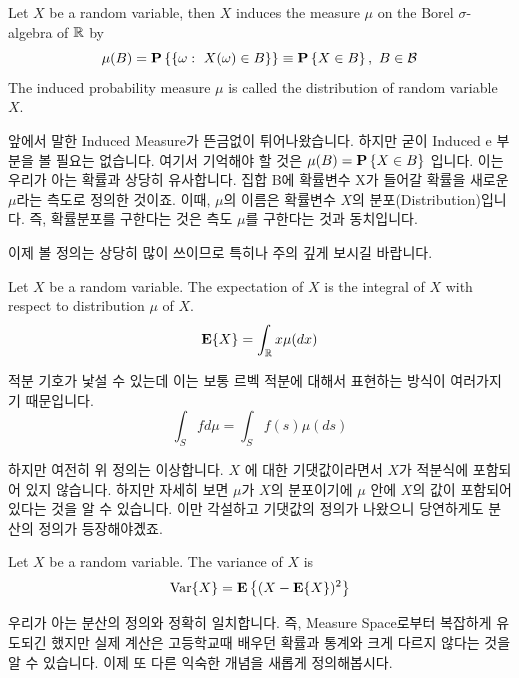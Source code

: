 \documentclass[final]{IEEEphot}
\begin{document}
\begin{definition}
	Let $X$ be a random variable, then $X$ induces the measure $\mu$ on the Borel $\sigma$-algebra of $\mathbb{R}$ by
	$$\mu(B) = \mathbf{P} \left\{ \{\omega:~ X(\omega)\in B\} \right\} \equiv \mathbf{P} \left\{ X\in B \right\}, ~ B \in \mathcal{B}$$
	The induced probability measure $\mu$ is called the distribution of random variable $X$.
	
	\HL
\end{definition}

앞에서 말한 Induced Measure가 뜬금없이 튀어나왔습니다. 하지만 굳이 Induced e 부분을 볼 필요는 없습니다. 여기서 기억해야 할 것은 $\mu(B) = \mathbf{P} \left\{ X \in B \right\}$ 입니다. 이는 우리가 아는 확률과 상당히 유사합니다. 집합 B에 확률변수 X가 들어갈 확률을 새로운 $\mu$라는 측도로 정의한 것이죠. 이때, $\mu$의 이름은 확률변수 $X$의 분포(Distribution)입니다. 즉, 확률분포를 구한다는 것은 측도 $\mu$를 구한다는 것과 동치입니다.

\VS

\HS 이제 볼 정의는 상당히 많이 쓰이므로 특히나 주의 깊게 보시길 바랍니다.

\begin{definition}[Expectation]
	Let $X$ be a random variable. The expectation of $X$ is the integral of $X$ with respect to distribution $\mu$ of $X$.
	$$ \mathbf{E}\{X\} = \int_{\mathbb{R}} x \mu(dx)$$
	
	\HL
\end{definition}

적분 기호가 낯설 수 있는데 이는 보통 르벡 적분에 대해서 표현하는 방식이 여러가지기 때문입니다.
$$\int_S f d\mu = \int_S f(s) \mu(ds) $$

하지만 여전히 위 정의는 이상합니다. $X$ 에 대한 기댓값이라면서 $X$가 적분식에 포함되어 있지 않습니다. 하지만 자세히 보면 $\mu$가 $X$의 분포이기에 $\mu$ 안에 $X$의 값이 포함되어 있다는 것을 알 수 있습니다.
이만 각설하고 기댓값의 정의가 나왔으니 당연하게도 분산의 정의가 등장해야곘죠.

\newpage

\begin{definition}[Variance]
	Let $X$ be a random variable. The variance of $X$ is
	$$ \operatorname*{Var}\{X\} = \mathbf{E} \left\{ (X - \mathbf{E}\{X\})^2 \right\}$$
	
	\HL
\end{definition}

우리가 아는 분산의 정의와 정확히 일치합니다. 즉, Measure Space로부터 복잡하게 유도되긴 했지만 실제 계산은 고등학교때 배우던 확률과 통계와 크게 다르지 않다는 것을 알 수 있습니다. 이제 또 다른 익숙한 개념을 새롭게 정의해봅시다.
\end{document}

